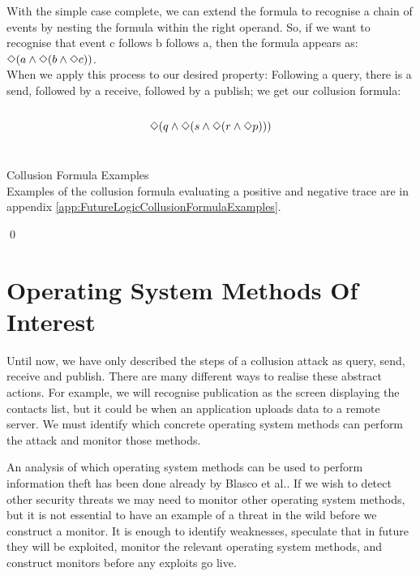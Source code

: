 With the simple case complete, we can extend the formula to recognise a chain of events by nesting the formula within the right operand.  So, if we want to recognise that event c follows b follows a, then the formula appears as:
$\Diamond(a \land \Diamond(b \land \Diamond c))$.\\

When we apply this process to our desired property: Following a query, there is a send, followed by a receive, followed by a publish; we get our collusion formula:\\
\\
$$\Diamond(q \land \Diamond(s \land \Diamond(r \land \Diamond p)))$$\\

\begin{myEx} Collusion Formula Examples\\

Examples of the collusion formula evaluating a positive and negative trace are in appendix \ref{app:FutureLogicCollusionFormulaExamples}.

\qed
\end{myEx}

\section{Operating System Methods Of Interest}
\label{sec:OSMethodsOfInterest}

Until now, we have only described the steps of a collusion attack as query, send, receive and publish.  There are many different ways to realise these abstract actions.  For example, we will recognise publication as the screen displaying the contacts list, but it could be when an application uploads data to a remote server.  We must identify which concrete operating system methods can perform the attack and monitor those methods.

An analysis of which operating system methods can be used to perform information theft has been done already by Blasco et al.\cite{PrologAppCollusion}.  If we wish to detect other security threats we may need to monitor other operating system methods, but it is not essential to have an example of a threat in the wild before we construct a monitor.  It is enough to identify weaknesses, speculate that in future they will be exploited, monitor the relevant operating system methods, and construct monitors before any exploits go live.\\

